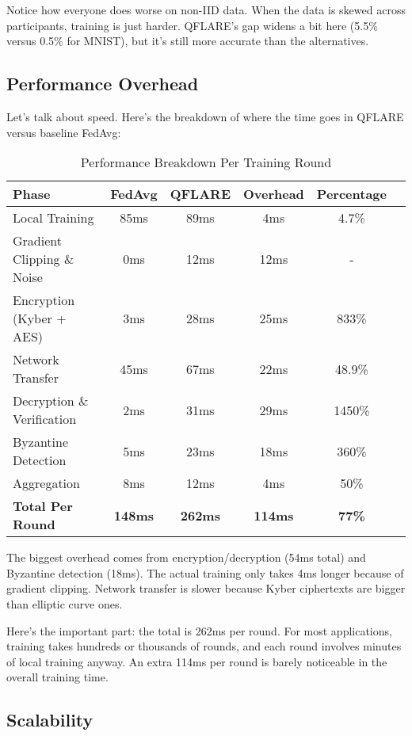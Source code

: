 \documentclass[journal,onecolumn]{IEEEtran}
\begin{document}
Notice how everyone does worse on non-IID data. When the data is skewed across participants, training is just harder. QFLARE's gap widens a bit here (5.5\% versus 0.5\% for MNIST), but it's still more accurate than the alternatives.

\subsection{Performance Overhead}

Let's talk about speed. Here's the breakdown of where the time goes in QFLARE versus baseline FedAvg:

\begin{table}[htbp]
\centering
\caption{Performance Breakdown Per Training Round}
\label{tab:performance_breakdown}
\begin{tabular}{@{}lccccc@{}}
\toprule
\textbf{Phase} & \textbf{FedAvg} & \textbf{QFLARE} & \textbf{Overhead} & \textbf{Percentage} \\
\midrule
Local Training & 85ms & 89ms & 4ms & 4.7\% \\
Gradient Clipping \& Noise & 0ms & 12ms & 12ms & - \\
Encryption (Kyber + AES) & 3ms & 28ms & 25ms & 833\% \\
Network Transfer & 45ms & 67ms & 22ms & 48.9\% \\
Decryption \& Verification & 2ms & 31ms & 29ms & 1450\% \\
Byzantine Detection & 5ms & 23ms & 18ms & 360\% \\
Aggregation & 8ms & 12ms & 4ms & 50\% \\
\midrule
\textbf{Total Per Round} & \textbf{148ms} & \textbf{262ms} & \textbf{114ms} & \textbf{77\%} \\
\bottomrule
\end{tabular}
\end{table}

The biggest overhead comes from encryption/decryption (54ms total) and Byzantine detection (18ms). The actual training only takes 4ms longer because of gradient clipping. Network transfer is slower because Kyber ciphertexts are bigger than elliptic curve ones.

Here's the important part: the total is 262ms per round. For most applications, training takes hundreds or thousands of rounds, and each round involves minutes of local training anyway. An extra 114ms per round is barely noticeable in the overall training time.

\subsection{Scalability}
\end{document}
